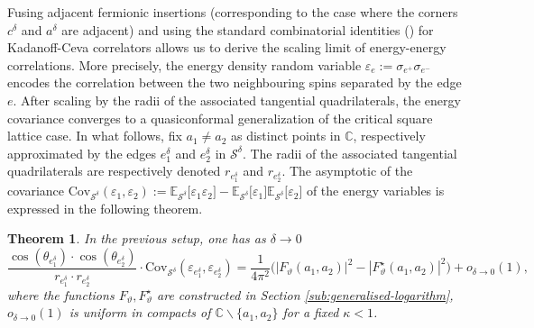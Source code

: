 \documentclass[reqno]{amsart}
\numberwithin{equation}{section}
\newtheorem{theo}{Theorem}[section]
\theoremstyle{definition}
\theoremstyle{remark}
\newcommand\cS{\mathcal{S}}
\begin{document}
Fusing adjacent fermionic insertions (corresponding to the case where the corners $c^\delta$ and $a^\delta$ are adjacent) and using the standard combinatorial identities (\cite{HonPHD,WanPHD,HonParGhe,CCK}) for Kadanoff-Ceva correlators allows us to derive the scaling limit of energy-energy correlations. More precisely, the energy density random variable $\varepsilon_e := \sigma_{e^+}\sigma_{e^-}$ encodes the correlation between the two neighbouring spins separated by the edge $e$. After scaling by the radii of the associated tangential quadrilaterals, the energy covariance converges to a quasiconformal generalization of the critical square lattice case. In what follows, fix $a_1\neq a_2$ as distinct points in $\mathbb{C}$, respectively approximated by the edges $e_1^\delta$ and $e_2^\delta$ in $\cS^\delta$. The radii of the associated tangential quadrilaterals are respectively denoted $r_{e_1^\delta}$ and $r_{e_2^\delta}$. The asymptotic of the covariance $\textrm{Cov}_{\cS^\delta}(\varepsilon_1,\varepsilon_2):= \mathbb{E}_{\cS^\delta}[\varepsilon_1  \varepsilon_2 \big] - \mathbb{E}_{\cS^\delta}[\varepsilon_1 \big]\mathbb{E}_{\cS^\delta}[\varepsilon_2 \big]  $ of the energy variables is expressed in the following theorem.
\begin{theo}\label{thm:convergerence-energy}
In the previous setup, one has as $\delta \to 0 $ \begin{equation}\label{eq:convergence-energy}
	\frac{\cos(\theta_{e_1^\delta}) \cdot\cos(\theta_{e_2^\delta})}{r_{e_1^\delta} \cdot r_{e_2^\delta}}\cdot \mathrm{Cov}_{\cS^\delta}(\varepsilon_{e_1^\delta},\varepsilon_{e_2^\delta}) = \frac{1}{4\pi^2} \big(|F_{\vartheta}(a_1,a_2)|^2 -|F^\star_{\vartheta}(a_1,a_2)|^2) + o_{\delta \to 0}(1),
\end{equation}
where the functions $F_{\vartheta},F^\star_{\vartheta}$ are constructed in Section \ref{sub:generalised-logarithm}, $ o_{\delta \to 0}(1)$ is uniform in compacts of $\mathbb{C}\backslash \{ a_1,a_2 \}$ for a fixed $\kappa<1$. 
\end{theo}
\end{document}
